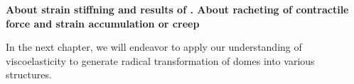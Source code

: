 \textbf{About strain stiffning and results of \cite{duque2023}. About racheting of contractile force \cite{clement2017, mason2011} and strain accumulation or creep}

In the next chapter, we will endeavor to apply our understanding of viscoelasticity to generate radical transformation of domes into various structures.
